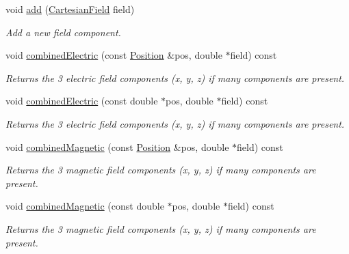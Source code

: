 \begin{DoxyCompactItemize}
void \hyperlink{class_d_d4hep_1_1_geometry_1_1_overlayed_field_a035b1481dfc0a04b37a31795e3df0ba2}{add} (\hyperlink{class_d_d4hep_1_1_geometry_1_1_cartesian_field}{CartesianField} field)
\begin{DoxyCompactList}\small\item\em Add a new field component. \item\end{DoxyCompactList}\item 
void \hyperlink{class_d_d4hep_1_1_geometry_1_1_overlayed_field_a5b4697422c41e1eae7cff779f8ff5dcf}{combinedElectric} (const \hyperlink{namespace_d_d4hep_1_1_geometry_a55083902099d03506c6db01b80404900}{Position} \&pos, double $\ast$field) const 
\begin{DoxyCompactList}\small\item\em Returns the 3 electric field components (x, y, z) if many components are present. \item\end{DoxyCompactList}\item 
void \hyperlink{class_d_d4hep_1_1_geometry_1_1_overlayed_field_ab00ec3a945a635c235e9ae5d6cffcf03}{combinedElectric} (const double $\ast$pos, double $\ast$field) const 
\begin{DoxyCompactList}\small\item\em Returns the 3 electric field components (x, y, z) if many components are present. \item\end{DoxyCompactList}\item 
void \hyperlink{class_d_d4hep_1_1_geometry_1_1_overlayed_field_aecc0411ef346abd521b0d3ddbc8a570e}{combinedMagnetic} (const \hyperlink{namespace_d_d4hep_1_1_geometry_a55083902099d03506c6db01b80404900}{Position} \&pos, double $\ast$field) const 
\begin{DoxyCompactList}\small\item\em Returns the 3 magnetic field components (x, y, z) if many components are present. \item\end{DoxyCompactList}\item 
void \hyperlink{class_d_d4hep_1_1_geometry_1_1_overlayed_field_aab6c2dd942c5970006201ca7aaee7f23}{combinedMagnetic} (const double $\ast$pos, double $\ast$field) const 
\begin{DoxyCompactList}\small\item\em Returns the 3 magnetic field components (x, y, z) if many components are present. \item\end{DoxyCompactList}\item 

\end{DoxyCompactItemize}
